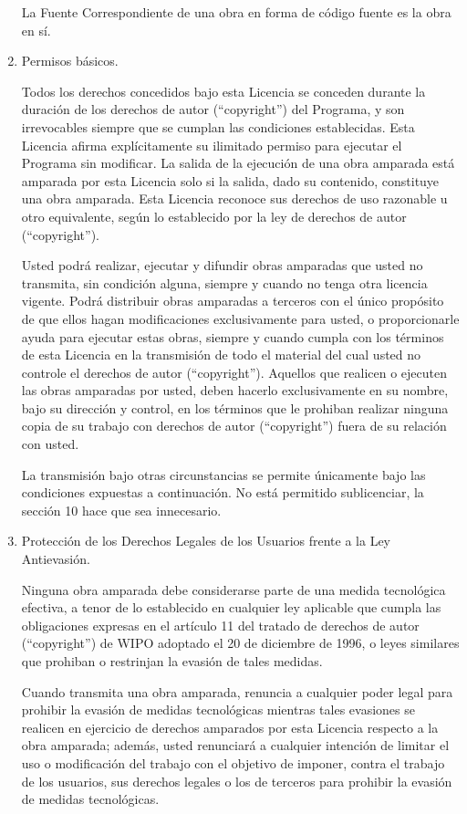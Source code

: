 \documentclass[11pt]{article}
\begin{document}
\begin{enumerate}
La Fuente Correspondiente de una obra en forma de c\'{o}digo fuente es la obra en s\'{i}.

\item Permisos b\'{a}sicos.

Todos los derechos concedidos bajo esta Licencia se conceden durante la duraci\'{o}n de los derechos de autor (``copyright'') del Programa, y son irrevocables siempre que se cumplan las condiciones establecidas. Esta Licencia afirma expl\'{i}citamente su ilimitado permiso para ejecutar el Programa sin modificar. La salida de la ejecuci\'{o}n de una obra amparada est\'{a} amparada por esta Licencia solo si la salida, dado su contenido, constituye una obra amparada. Esta Licencia reconoce sus derechos de uso razonable u otro equivalente, seg\'{u}n lo establecido por la ley de derechos de autor (``copyright'').

Usted podr\'{a} realizar, ejecutar y difundir obras amparadas que usted no transmita, sin condici\'{o}n alguna, siempre y cuando no tenga otra licencia vigente. Podr\'{a} distribuir obras amparadas a terceros con el \'{u}nico prop\'{o}sito de que ellos hagan modificaciones exclusivamente para usted, o proporcionarle ayuda para ejecutar estas obras, siempre y cuando cumpla con los t\'{e}rminos de esta Licencia en la transmisi\'{o}n de todo el material del cual usted no controle el derechos de autor (``copyright''). Aquellos que realicen o ejecuten las obras amparadas por usted, deben hacerlo exclusivamente en su nombre, bajo su direcci\'{o}n y control, en los t\'{e}rminos que le prohiban realizar ninguna copia de su trabajo con derechos de autor (``copyright'') fuera de su relaci\'{o}n con usted.

La transmisi\'{o}n bajo otras circunstancias se permite \'{u}nicamente bajo las condiciones expuestas a  continuaci\'{o}n. No est\'{a} permitido sublicenciar, la secci\'{o}n 10 hace que sea innecesario.

\item Protecci\'{o}n de los Derechos Legales de los Usuarios frente a la 
Ley Antievasi\'{o}n.

Ninguna obra amparada debe considerarse parte de una medida tecnol\'{o}gica 
efectiva, a tenor de lo establecido en cualquier ley aplicable que cumpla 
las obligaciones expresas en el art\'{i}culo 11 del tratado de derechos de autor (``copyright'') de WIPO 
adoptado el 20 de diciembre de 1996, o leyes similares que prohiban o 
restrinjan la evasi\'{o}n de tales medidas.

Cuando transmita una obra amparada, renuncia a cualquier poder legal 
para prohibir la evasi\'{o}n de medidas tecnol\'{o}gicas mientras tales evasiones 
se realicen en ejercicio de derechos amparados por esta Licencia respecto 
a la obra amparada; adem\'{a}s, usted renunciar\'{a} a cualquier intenci\'{o}n de 
limitar el uso o modificaci\'{o}n del trabajo con el objetivo de imponer, 
contra el trabajo de los usuarios, sus derechos legales o los de terceros 
para prohibir la evasi\'{o}n de medidas tecnol\'{o}gicas.


\end{enumerate}
\end{document}

